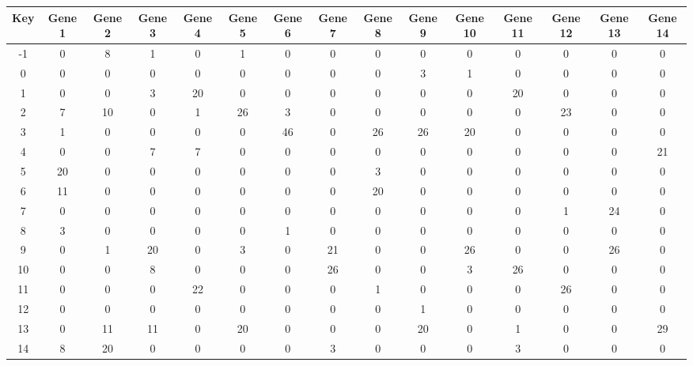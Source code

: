 \begin{tabular}{|c|c|c|c|c|c|c|c|c|c|c|c|c|c|c|}
\hline
Key & Gene 1 & Gene 2 & Gene 3 & Gene 4 & Gene 5 & Gene 6 & Gene 7 & Gene 8 & Gene 9 & Gene 10 & Gene 11 & Gene 12 & Gene 13 & Gene 14 \\
\hline
-1 & 0 & 8 & 1 & 0 & 1 & 0 & 0 & 0 & 0 & 0 & 0 & 0 & 0 & 0 \\
0 & 0 & 0 & 0 & 0 & 0 & 0 & 0 & 0 & 3 & 1 & 0 & 0 & 0 & 0 \\
1 & 0 & 0 & 3 & 20 & 0 & 0 & 0 & 0 & 0 & 0 & 20 & 0 & 0 & 0 \\
2 & 7 & 10 & 0 & 1 & 26 & 3 & 0 & 0 & 0 & 0 & 0 & 23 & 0 & 0 \\
3 & 1 & 0 & 0 & 0 & 0 & 46 & 0 & 26 & 26 & 20 & 0 & 0 & 0 & 0 \\
4 & 0 & 0 & 7 & 7 & 0 & 0 & 0 & 0 & 0 & 0 & 0 & 0 & 0 & 21 \\
5 & 20 & 0 & 0 & 0 & 0 & 0 & 0 & 3 & 0 & 0 & 0 & 0 & 0 & 0 \\
6 & 11 & 0 & 0 & 0 & 0 & 0 & 0 & 20 & 0 & 0 & 0 & 0 & 0 & 0 \\
7 & 0 & 0 & 0 & 0 & 0 & 0 & 0 & 0 & 0 & 0 & 0 & 1 & 24 & 0 \\
8 & 3 & 0 & 0 & 0 & 0 & 1 & 0 & 0 & 0 & 0 & 0 & 0 & 0 & 0 \\
9 & 0 & 1 & 20 & 0 & 3 & 0 & 21 & 0 & 0 & 26 & 0 & 0 & 26 & 0 \\
10 & 0 & 0 & 8 & 0 & 0 & 0 & 26 & 0 & 0 & 3 & 26 & 0 & 0 & 0 \\
11 & 0 & 0 & 0 & 22 & 0 & 0 & 0 & 1 & 0 & 0 & 0 & 26 & 0 & 0 \\
12 & 0 & 0 & 0 & 0 & 0 & 0 & 0 & 0 & 1 & 0 & 0 & 0 & 0 & 0 \\
13 & 0 & 11 & 11 & 0 & 20 & 0 & 0 & 0 & 20 & 0 & 1 & 0 & 0 & 29 \\
14 & 8 & 20 & 0 & 0 & 0 & 0 & 3 & 0 & 0 & 0 & 3 & 0 & 0 & 0 \\
\hline
\end{tabular}